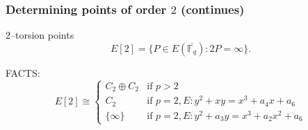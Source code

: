 \documentclass[12pt,handout]{beamer} %
\newcommand{\F}{\mathbb F}
\theoremstyle{definition}
\begin{document}
\begin{frame}\frametitle{Determining points of order $2$ (continues)}

% 
% 
% 
% 

\begin{Definition}{$2$--torsion points}
$$E[2]=\{P\in E(\overline{\F_q}): 2P=\infty\}.$$
\end{Definition}\pause

\begin{beamerboxesrounded}[upper=block title example,lower=block body alerted,shadow=true]{FACTS:}
$$E[2]\cong \begin{cases}
C_2\oplus C_2 &\text{if }p>2\\
C_2           &\text{if }p=2, E: y^2+xy=x^3+a_4x+a_6\\
\{\infty\}    &\text{if }p=2, E: y^2+a_3y=x^3+a_2x^2+a_6
\end{cases}
$$
\end{beamerboxesrounded}\pause


% 

\end{frame}
\end{document}

